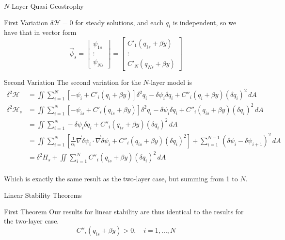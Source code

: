 \documentclass[12pt]{article}
\begin{document}
\begin{section}{$N$-Layer Quasi-Geostrophy}
\begin{subsection}{First Variation}
        $\delta \mathcal{H} = 0$ for steady solutions, and each $q_i$ is independent, so we have that in vector form
        \begin{equation}
        \vec \psi_s =
        \left[\begin{array}{c}
        \psi_{1s} \\
        \vdots \\
        \psi_{Ns}
        \end{array}\right]
        =
        \left[\begin{array}{c}
        C'_1(q_{1s} + \beta y) \\
        \vdots \\
        C'_N(q_{Ns} + \beta y)
        \end{array}\right]
        \end{equation}
    \end{subsection}

    \begin{subsection}{Second Variation}
        The second variation for the $N$-layer model is
        \begin{align*}
            \delta^2 \mathcal{H} &= \iint \sum_{i=1}^N \left[ - \psi_i + C'_i(q_i + \beta y) \right]  \delta^2 q_i  - \delta \psi_i \delta q_i +  C''_i(q_i + \beta y) (\delta q_i)^2  \, dA \\
            \delta^2 \mathcal{H}_s &= \iint \sum_{i=1}^N \left[ - \psi_{is} + C'_i(q_{is} + \beta y) \right]  \delta^2 q_i  - \delta \psi_i \delta q_i +  C''_i(q_{is} + \beta y) (\delta q_i)^2  \, dA \\
            &= \iint \sum_{i=1}^N - \delta \psi_i \delta q_i +  C''_i(q_{is} + \beta y) (\delta q_i)^2  \, dA \\
            &= \iint \sum_{i=1}^N \left[ \frac{1}{\alpha_i} \vec\nabla\delta\psi_i \cdot \vec\nabla\delta\psi_i + C''_i(q_{is} + \beta y) (\delta q_i)^2 \right] + \sum_{i=1}^{N-1}(\delta\psi_i - \delta\psi_{i+1})^2 \, dA \\
            &= \delta^2 H_s + \iint \sum_{i=1}^N C''_i(q_{is} + \beta y)(\delta q_i)^2 \, dA \\
        \end{align*}

        Which is exactly the same result as the two-layer case, but summing from 1 to $N$.
    \end{subsection}

    \begin{subsection}{Linear Stability Theorems}
        \begin{subsubsection}{First Theorem}
            Our results for linear stability are thus identical to the results for the two-layer case.
            $$
            C''_i(q_{is} + \beta y) > 0, \quad i=1,...,N
            $$


\end{subsubsection}
\end{subsection}
\end{section}
\end{document}
